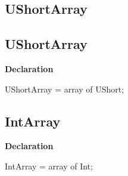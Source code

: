 \documentclass{report}
\newif\ifpdf
\begin{document}
\subsection*{\large{\textbf{UShortArray}}\normalsize\hspace{1ex}\hrulefill}
\else
\subsection*{UShortArray}
\fi
\label{NewPascal.Base-UShortArray}
\begin{list}{}{
\setlength{\itemindent}{0cm}
\setlength{\listparindent}{0cm}
\setlength{\leftmargin}{\evensidemargin}
\addtolength{\leftmargin}{\tmplength}
\settowidth{\labelsep}{X}
\addtolength{\leftmargin}{\labelsep}
\setlength{\labelwidth}{\tmplength}
}
\item[\textbf{Declaration}\hfill]
\ifpdf
\begin{flushleft}
\fi
\begin{ttfamily}
UShortArray = array of UShort;\end{ttfamily}

\ifpdf
\end{flushleft}
\fi

\end{list}
\ifpdf
\subsection*{\large{\textbf{IntArray}}\normalsize\hspace{1ex}\hrulefill}
\else
\subsection*{IntArray}
\fi
\label{NewPascal.Base-IntArray}
\begin{list}{}{
\setlength{\itemindent}{0cm}
\setlength{\listparindent}{0cm}
\setlength{\leftmargin}{\evensidemargin}
\addtolength{\leftmargin}{\tmplength}
\settowidth{\labelsep}{X}
\addtolength{\leftmargin}{\labelsep}
\setlength{\labelwidth}{\tmplength}
}
\item[\textbf{Declaration}\hfill]
\ifpdf
\begin{flushleft}
\fi
\begin{ttfamily}
IntArray = array of Int;\end{ttfamily}

\ifpdf
\end{flushleft}
\fi

\end{list}
\ifpdf
\end{document}
